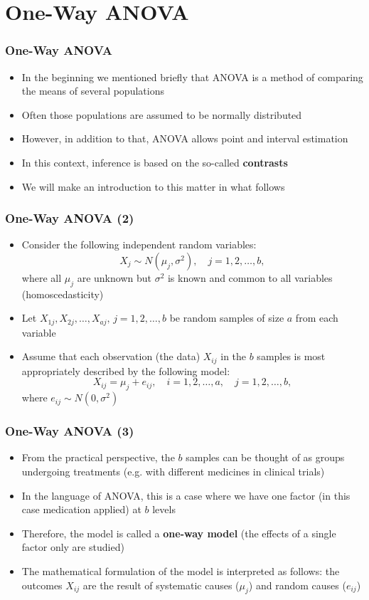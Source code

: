 \documentclass[10pt]{beamer}
\theoremstyle{definition}
\begin{document}
\section{One-Way ANOVA}
\begin{frame}[fragile]
\frametitle{One-Way ANOVA}
\begin{itemize}
	\item In the beginning we mentioned briefly that ANOVA is a method of comparing the means of several populations
	\item Often those populations are assumed to be normally distributed
	\item However, in addition to that, ANOVA allows point and interval estimation 
	\item In this context, inference is based on the so-called \textbf{contrasts}
	\item We will make an introduction to this matter in what follows
\end{itemize}
\end{frame}

\begin{frame}[fragile]
\frametitle{One-Way ANOVA (2)}
\begin{itemize}
	\item Consider the following independent random variables:
	\[
		X_{j} \sim N(\mu_{j},\sigma^{2}),\quad j = 1,2,\ldots,b,
	\]
	where all $\mu_{j}$ are unknown but $\sigma^{2}$ is known and common to all variables (homoscedasticity)
	\item Let $X_{1j},X_{2j},\ldots,X_{aj},\,j=1,2,\ldots,b$ be random samples of size $a$ from each variable
	\item Assume that each observation (the data) $X_{ij}$ in the $b$ samples is most appropriately described by the following model:
	\[
		X_{ij} = \mu_{j} + e_{ij}, \quad i = 1,2,\ldots,a,\quad j = 1,2,\ldots,b,
	\]
	where $e_{ij}\sim N(0,\sigma^{2})$
	
\end{itemize}
\end{frame}

\begin{frame}[fragile]
\frametitle{One-Way ANOVA (3)}
\begin{itemize}
	\item From the practical perspective, the $b$ samples can be thought of as groups undergoing treatments (e.g. with different medicines in clinical trials)
	\item In the language of ANOVA, this is a case where we have one factor (in this case medication applied) at $b$ levels
	\item Therefore, the model is called a \textbf{one-way model} (the effects of a single factor only are studied)
	\item The mathematical formulation of the model is interpreted as follows: the outcomes $X_{ij}$ are the result of systematic causes ($\mu_{j}$) and random causes ($e_{ij}$)
\end{itemize}
\end{frame}
\end{document}
